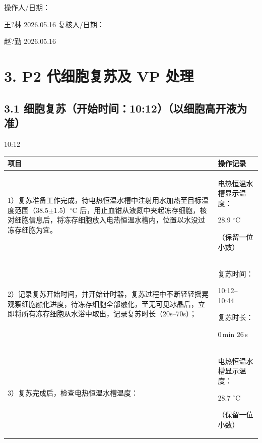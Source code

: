 \documentclass[UTF8,10pt,a4paper,fontset=fandol]{ctexart}
\newcommand{\fieldvalue}[1]{#1}
\newcommand{\handwritten}[1]{#1}
\begin{document}
\vspace{0.2em}

操作人/日期：

\fieldvalue{\handwritten{王?林}}
\quad
\fieldvalue{\handwritten{2026.05.16}}
\hfill
复核人/日期：

\fieldvalue{\handwritten{赵?勤}}
\quad
\fieldvalue{\handwritten{2026.05.16}}

\section{3. P2 代细胞复苏及 VP 处理}

\subsection{3.1 细胞复苏（开始时间：10:12）（以细胞高开液为准）}

\fieldvalue{\handwritten{10:12}}

\begin{tabularx}{\textwidth}{|X|p{}|}
\hline
\textbf{项目} & \textbf{操作记录} \\
\hline
1）复苏准备工作完成，待电热恒温水槽中注射用水加热至目标温度范围（38.5$\pm$1.5）$^\circ$C 后，用止血钳从液氮中夹起冻存细胞，核对细胞信息后，将冻存细胞放入电热恒温水槽内，位置以水没过冻存细胞为宜。 &
电热恒温水槽显示温度：

\fieldvalue{\handwritten{28.9}} $^\circ$C

（保留一位小数） \\
\hline
2）记录复苏开始时间，并开始计时器，复苏过程中不断轻轻摇晃观察细胞融化进度，待冻存细胞全部融化，至无可见冰晶后，立即将所有冻存细胞从水浴中取出，记录复苏时长（20s--70s）； &
复苏时间：

\fieldvalue{\handwritten{10:12}}--%
\fieldvalue{\handwritten{10:44}}

复苏时长：

\fieldvalue{\handwritten{0}}\,min\space{}
\fieldvalue{\handwritten{26}}\,s \\
\hline
3）复苏完成后，检查电热恒温水槽温度： &
电热恒温水槽显示温度：

\fieldvalue{\handwritten{28.7}} $^\circ$C

（保留一位小数） \\
\hline
\end{tabularx}
\end{document}
